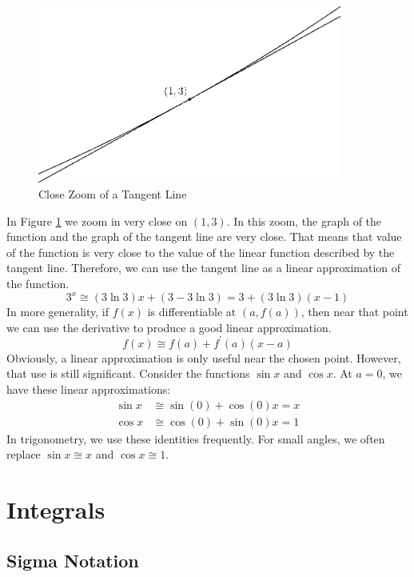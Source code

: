 \documentclass[fleqn]{report}
\begin{document}
\begin{figure}[t]
\centering
\includegraphics[width=10cm]{figure52.eps}
\caption{Close Zoom of a Tangent Line}
\label{figure-tangent-zoom}
\end{figure}

In Figure \ref{figure-tangent-zoom} we zoom in very
close on $(1,3)$.  In this zoom, the graph of the function and
the graph of the tangent line are very close. That means that
value of the function is very close to the value of the linear
function described by the tangent line. Therefore, we can use
the tangent line as a linear approximation of the function. 
\begin{equation*}
3^x \cong (3 \ln 3) x + (3 - 3 \ln 3) = 3 + (3 \ln 3) (x- 1)
\end{equation*}
In more generality, if $f(x)$ is differentiable at $(a,
f(a))$, then near that point we can use the derivative to
produce a good linear approximation.
\begin{equation*}
f(x) \cong f(a) + f^\prime(a) (x-a)
\end{equation*}
Obviously, a linear approximation is only useful near the
chosen point. However, that use is still significant.
Consider the functions $\sin x$ and $\cos x$. At $a=0$, we
have these linear approximations:
\begin{align*}
\sin x & \cong \sin (0) + \cos (0) x = x \\
\cos x & \cong \cos (0) + \sin (0) x = 1
\end{align*}
In trigonometry, we use these identities frequently. For small
angles, we often replace $\sin x \cong x$ and $\cos x \cong 1$.

\chapter{Integrals}
\label{integrals}

\section{Sigma Notation}
\label{sigma-notation}
\end{document}
